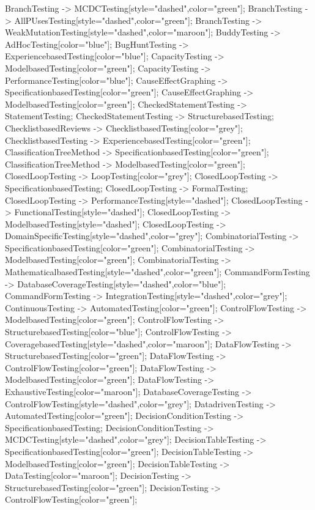 \documentclass{article}
\begin{document}
{BranchTesting -> MCDCTesting[style="dashed",color="green"];
BranchTesting -> AllPUsesTesting[style="dashed",color="green"];
BranchTesting -> WeakMutationTesting[style="dashed",color="maroon"];
BuddyTesting -> AdHocTesting[color="blue"];
BugHuntTesting -> ExperiencebasedTesting[color="blue"];
CapacityTesting -> ModelbasedTesting[color="green"];
CapacityTesting -> PerformanceTesting[color="blue"];
CauseEffectGraphing -> SpecificationbasedTesting[color="green"];
CauseEffectGraphing -> ModelbasedTesting[color="green"];
CheckedStatementTesting -> StatementTesting;
CheckedStatementTesting -> StructurebasedTesting;
ChecklistbasedReviews -> ChecklistbasedTesting[color="grey"];
ChecklistbasedTesting -> ExperiencebasedTesting[color="green"];
ClassificationTreeMethod -> SpecificationbasedTesting[color="green"];
ClassificationTreeMethod -> ModelbasedTesting[color="green"];
ClosedLoopTesting -> LoopTesting[color="grey"];
ClosedLoopTesting -> SpecificationbasedTesting;
ClosedLoopTesting -> FormalTesting;
ClosedLoopTesting -> PerformanceTesting[style="dashed"];
ClosedLoopTesting -> FunctionalTesting[style="dashed"];
ClosedLoopTesting -> ModelbasedTesting[style="dashed"];
ClosedLoopTesting -> DomainSpecificTesting[style="dashed",color="grey"];
CombinatorialTesting -> SpecificationbasedTesting[color="green"];
CombinatorialTesting -> ModelbasedTesting[color="green"];
CombinatorialTesting -> MathematicalbasedTesting[style="dashed",color="green"];
CommandFormTesting -> DatabaseCoverageTesting[style="dashed",color="blue"];
CommandFormTesting -> IntegrationTesting[style="dashed",color="grey"];
ContinuousTesting -> AutomatedTesting[color="green"];
ControlFlowTesting -> ModelbasedTesting[color="green"];
ControlFlowTesting -> StructurebasedTesting[color="blue"];
ControlFlowTesting -> CoveragebasedTesting[style="dashed",color="maroon"];
DataFlowTesting -> StructurebasedTesting[color="green"];
DataFlowTesting -> ControlFlowTesting[color="green"];
DataFlowTesting -> ModelbasedTesting[color="green"];
DataFlowTesting -> ExhaustiveTesting[color="maroon"];
DatabaseCoverageTesting -> ControlFlowTesting[style="dashed",color="grey"];
DatadrivenTesting -> AutomatedTesting[color="green"];
DecisionConditionTesting -> SpecificationbasedTesting;
DecisionConditionTesting -> MCDCTesting[style="dashed",color="grey"];
DecisionTableTesting -> SpecificationbasedTesting[color="green"];
DecisionTableTesting -> ModelbasedTesting[color="green"];
DecisionTableTesting -> DataTesting[color="maroon"];
DecisionTesting -> StructurebasedTesting[color="green"];
DecisionTesting -> ControlFlowTesting[color="green"];
}
\end{document}
